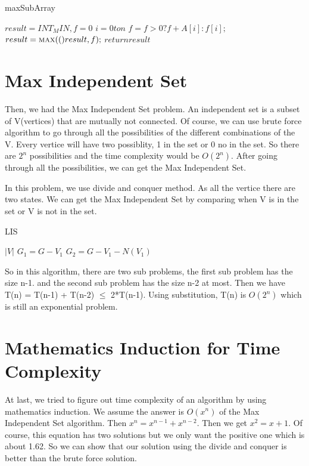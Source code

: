 \documentclass[usletter]{article}
\begin{document}
\begin{algorithm}
\caption{maxSubArray}
\begin{algorithmic}[1]
\State $result=INT_MIN,f=0$
\For${i = 0 to n}$
		\State $f=f>0?f+A[i]:f[i];$
		\State $result=\Call {max}(result,f);$
\EndFor
\State $return result$
\EndProcedure
\end{algorithmic}
\end{algorithm}

\section{Max Independent Set}
Then, we had the Max Independent Set problem. An independent set is a subset of V(vertices) that are mutually not connected. Of course, we can use brute force algorithm to go through all the possibilities of the different combinations of the V. Every vertice will have two possiblity, 1 in the set or 0 no in the set. So there are $2^n$ possibilities and the time complexity would be $O(2^n)$. After going through all the possibilities, we can get the Max Independent Set.

In this problem, we use divide and conquer method. As all the vertice there are two states. We can get the Max Independent Set by comparing when V is in the set or V is not in the set.

\begin{algorithm}
\caption{LIS}
\begin{algorithmic}[2]
	\Return $|V|$
\EndIf
\State $G_{1} = G-{V_{1}}$
\State $G_{2} = G-{V_{1}}-N(V_{1})$
\Return {}
\EndProcedure
\end{algorithmic}
\end{algorithm}

So in this algorithm, there are two sub problems, the first sub problem has the size n-1. and the second sub problem has the size n-2 at most.
Then we have T(n) = T(n-1) + T(n-2) $\le$ 2*T(n-1). Using substitution, T(n) is $O(2^n)$ which is still an exponential problem.

\section{Mathematics Induction for Time Complexity}
At last, we tried to figure out time complexity of an algorithm by using mathematics induction. We assume the answer is $O(x^n)$ of the Max Independent Set algorithm. 
Then $x^n = x^{n-1} + x^{n-2}$. Then we get $x^2 = x + 1$. Of course, this equation has two solutions but we only want the positive one which is about 1.62. So we can show that our solution using the divide and conquer is better than the brute force solution.




\end{document}
